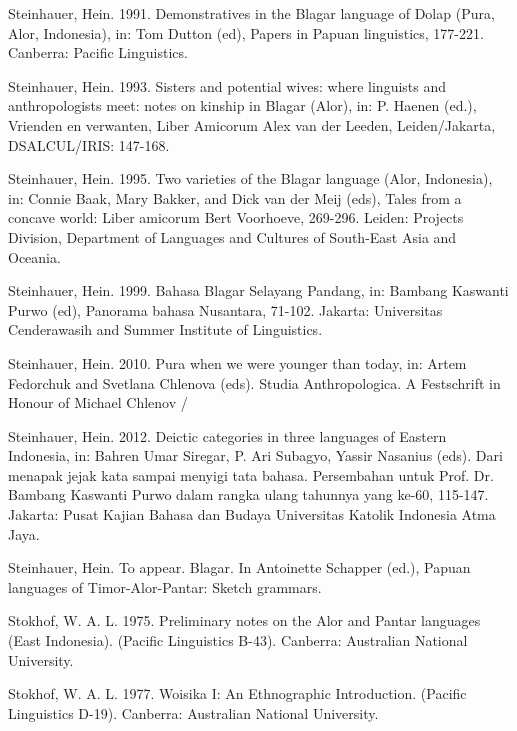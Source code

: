 Steinhauer, Hein. 1991. Demonstratives in the Blagar language of Dolap (Pura, Alor, Indonesia), in: Tom Dutton (ed), Papers in Papuan linguistics, 177-221. Canberra: Pacific Linguistics.

Steinhauer, Hein. 1993. Sisters and potential wives: where linguists and anthropologists meet:  notes on kinship in Blagar (Alor), in: P. Haenen (ed.), Vrienden en verwanten, Liber Amicorum Alex van der Leeden, Leiden/Jakarta, DSALCUL/IRIS: 147-168.

Steinhauer, Hein. 1995. Two varieties of the Blagar language (Alor, Indonesia), in: Connie Baak, Mary Bakker, and Dick van der Meij (eds), Tales from a concave world: Liber amicorum Bert Voorhoeve, 269-296. Leiden: Projects Division, Department of Languages and Cultures of South-East Asia and Oceania.

Steinhauer, Hein. 1999. Bahasa Blagar Selayang Pandang, in: Bambang Kaswanti Purwo (ed), Panorama bahasa Nusantara, 71-102. Jakarta: Universitas Cenderawasih and Summer Institute of Linguistics.

Steinhauer, Hein. 2010. Pura when we were younger than today, in: Artem Fedorchuk and Svetlana Chlenova (eds). Studia Anthropologica. A Festschrift in Honour of Michael Chlenov /

Steinhauer, Hein. 2012. Deictic categories in three languages of Eastern Indonesia, in: Bahren Umar Siregar, P. Ari Subagyo, Yassir Nasanius (eds). Dari menapak jejak kata sampai menyigi tata bahasa. Persembahan untuk Prof. Dr. Bambang Kaswanti Purwo dalam rangka ulang tahunnya yang ke-60, 115-147. Jakarta: Pusat Kajian Bahasa dan Budaya Universitas Katolik Indonesia Atma Jaya.

Steinhauer, Hein. To appear. Blagar. In Antoinette Schapper (ed.), Papuan languages of Timor-Alor-Pantar: Sketch grammars. 

Stokhof, W. A. L. 1975. Preliminary notes on the Alor and Pantar languages (East Indonesia). (Pacific Linguistics B-43). Canberra: Australian National University.

Stokhof, W. A. L. 1977. Woisika I: An Ethnographic Introduction. (Pacific Linguistics D-19). Canberra: Australian National University.

